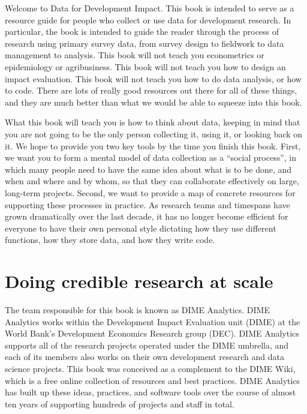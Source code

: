 \begin{fullwidth}
Welcome to Data for Development Impact.
This book is intended to serve as a resource guide
for people who collect or use data for development research.
In particular, the book is intended to guide the reader
through the process of research using primary survey data,
from survey design to fieldwork to data management to analysis.
This book will not teach you econometrics or epidemiology or agribusiness.
This book will not teach you how to design an impact evaluation.
This book will not teach you how to do data analysis, or how to code.
There are lots of really good resources out there for all of these things,
and they are much better than what we would be able to squeeze into this book.

What this book will teach you is how to think about data,
keeping in mind that you are not going to be the only person
collecting it, using it, or looking back on it.
We hope to provide you two key tools by the time you finish this book.
First, we want you to form a mental model of data collection as a ``social process'',
in which many people need to have the same idea about what is to be done, and when and where and by whom,
so that they can collaborate effectively on large, long-term projects.
Second, we want to provide a map of concrete resources for supporting these processes in practice.
As research teams and timespans have grown dramatically over the last decade,
it has no longer become efficient for everyone to have their own personal style
dictating how they use different functions, how they store data, and how they write code.
\end{fullwidth}


\section{Doing credible research at scale}

The team responsible for this book is known as DIME Analytics.
DIME Analytics works within the Development Impact Evaluation unit (DIME)
at the World Bank's Development Economics Research group (DEC).
DIME Analytics supports all of the research projects operated under the DIME umbrella,
and each of its members also works on their own development research and data science projects.
This book was conceived as a complement to the DIME Wiki,
which is a free online collection of resources and best practices.
DIME Analytics has built up these ideas, practices, and software tools
over the course of almost ten years of supporting hundreds of projects and staff in total.

